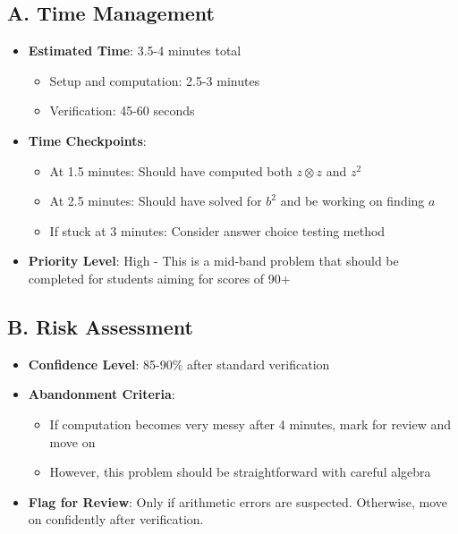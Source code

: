 \documentclass[12pt]{article}
\begin{document}
\begin{competitionbox}
\subsection*{A. Time Management}
\begin{itemize}[leftmargin=*]
    \item \textbf{Estimated Time}: 3.5-4 minutes total
    \begin{itemize}
        \item Setup and computation: 2.5-3 minutes
        \item Verification: 45-60 seconds
    \end{itemize}
    \item \textbf{Time Checkpoints}: 
    \begin{itemize}
        \item At 1.5 minutes: Should have computed both $z \otimes z$ and $z^2$
        \item At 2.5 minutes: Should have solved for $b^2$ and be working on finding $a$
        \item If stuck at 3 minutes: Consider answer choice testing method
    \end{itemize}
    \item \textbf{Priority Level}: High - This is a mid-band problem that should be completed for students aiming for scores of 90+
\end{itemize}

\subsection*{B. Risk Assessment}
\begin{itemize}[leftmargin=*]
    \item \textbf{Confidence Level}: 85-90\% after standard verification
    \item \textbf{Abandonment Criteria}: 
    \begin{itemize}
        \item If computation becomes very messy after 4 minutes, mark for review and move on
        \item However, this problem should be straightforward with careful algebra
    \end{itemize}
    \item \textbf{Flag for Review}: Only if arithmetic errors are suspected. Otherwise, move on confidently after verification.
\end{itemize}


\end{competitionbox}
\end{document}
